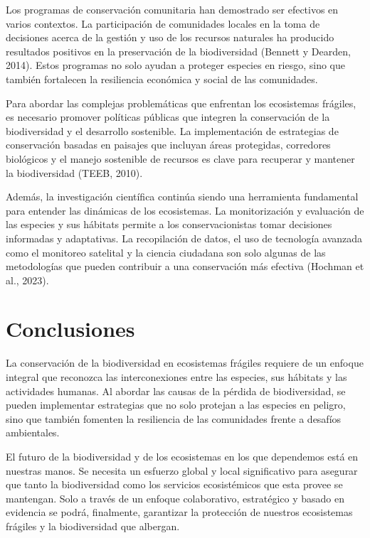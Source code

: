 \documentclass[
  letterpaper,
  DIV=11,
  numbers=noendperiod,
  oneside]{scrreprt}
\begin{document}
Los programas de conservación comunitaria han demostrado ser efectivos
en varios contextos. La participación de comunidades locales en la toma
de decisiones acerca de la gestión y uso de los recursos naturales ha
producido resultados positivos en la preservación de la biodiversidad
(Bennett y Dearden, 2014). Estos programas no solo ayudan a proteger
especies en riesgo, sino que también fortalecen la resiliencia económica
y social de las comunidades.

Para abordar las complejas problemáticas que enfrentan los ecosistemas
frágiles, es necesario promover políticas públicas que integren la
conservación de la biodiversidad y el desarrollo sostenible. La
implementación de estrategias de conservación basadas en paisajes que
incluyan áreas protegidas, corredores biológicos y el manejo sostenible
de recursos es clave para recuperar y mantener la biodiversidad (TEEB,
2010).

Además, la investigación científica continúa siendo una herramienta
fundamental para entender las dinámicas de los ecosistemas. La
monitorización y evaluación de las especies y sus hábitats permite a los
conservacionistas tomar decisiones informadas y adaptativas. La
recopilación de datos, el uso de tecnología avanzada como el monitoreo
satelital y la ciencia ciudadana son solo algunas de las metodologías
que pueden contribuir a una conservación más efectiva (Hochman et al.,
2023).

\section{Conclusiones}\label{conclusiones-4}

La conservación de la biodiversidad en ecosistemas frágiles requiere de
un enfoque integral que reconozca las interconexiones entre las
especies, sus hábitats y las actividades humanas. Al abordar las causas
de la pérdida de biodiversidad, se pueden implementar estrategias que no
solo protejan a las especies en peligro, sino que también fomenten la
resiliencia de las comunidades frente a desafíos ambientales.

El futuro de la biodiversidad y de los ecosistemas en los que dependemos
está en nuestras manos. Se necesita un esfuerzo global y local
significativo para asegurar que tanto la biodiversidad como los
servicios ecosistémicos que esta provee se mantengan. Solo a través de
un enfoque colaborativo, estratégico y basado en evidencia se podrá,
finalmente, garantizar la protección de nuestros ecosistemas frágiles y
la biodiversidad que albergan.
\end{document}
